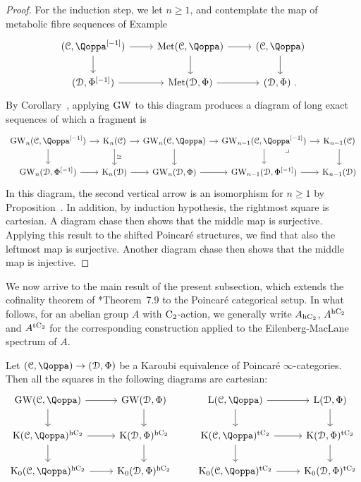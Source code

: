 \begin{proof}
For the induction step, we let $n\geq 1$, and 
contemplate the map of metabolic fibre sequences of Example~
\[
\begin{tikzcd} 
(\C,\QF\qshift{-1}) \ar[r] \ar[d] & \Met(\C,\QF) \ar[r] \ar[d] & (\C,\QF) \ar[d] \\
(\D,\QFD\qshift{-1}) \ar[r] & \Met(\D,\QFD)\ar[r] & (\D,\QFD) \ .
\end{tikzcd}
\]
By Corollary~,
applying $\operatorname{GW}$ to this diagram produces a diagram of long exact sequences of which a fragment is 
\[
\begin{tikzcd}
[column sep=1em] 
\GW_n(\C,\QF\qshift{-1}) \ar[r]\ar[d] & \K_n(\C)\ar[r]\ar[d,"\cong"] &\GW_n(\C,\QF)\ar[r]\ar[d] & \GW_{n-1}(\C,\QF\qshift{-1}) \ar[r]\ar[d]\arrow[dr, phantom, "\lrcorner", very near start]& \K_{n-1}(\C)\ar[d]\\
\GW_n(\D,\QFD\qshift{-1}) \ar[r] & \K_n(\D)\ar[r] & \GW_n(\D,\QFD)\ar[r] & \GW_{n-1}(\D, \QFD\qshift{-1}) \ar[r]& \K_{n-1}(\D)
\end{tikzcd}
\]
In this diagram, the second vertical arrow is an isomorphism for $n \geq 1$ by Proposition~. In addition, 
by induction hypothesis, 
the rightmost square is cartesian. A diagram chase then shows that the middle map is surjective. Applying this result to the shifted Poincar\'e structures, we find that also the leftmost map is surjective. Another diagram chase then shows that the middle map is injective.
\end{proof}


We now arrive to the main result of the present subsection, which extends the cofinality theorem of \cite{schlichting-derived}*{Theorem~7.9} 
to the Poincaré categorical setup. In what follows, for an abelian group $A$ with $\mathrm{C_2}$-action, we generally write $A_{\mathrm{h}\mathrm{C_2}}$, $A^{\mathrm{h}\mathrm{C_2}}$ and $A^{\mathrm{t}\mathrm{C_2}}$ for the corresponding construction applied to the Eilenberg-MacLane spectrum of $A$.


\begin{theorem}
\label{theorem:strong-cofinality}%
Let $(\C,\QF) \to (\D,\QFD)$ be a Karoubi equivalence of Poincaré $\infty$-categories.
Then all the squares in the following diagrams are cartesian:
\[
\begin{tikzcd}
\GW(\C,\QF)\ar[r]\ar[d] & \GW(\D,\QFD) \ar[d] \\
\K(\C,\QF)^\hC\ar[r]\ar[d] & \K(\D,\QFD)^\hC \ar[d] \\
\K_0(\C,\QF)^\hC\ar[r] & \K_0(\D,\QFD)^\hC
\end{tikzcd}
\qquad
\begin{tikzcd}
\L(\C,\QF)\ar[r]\ar[d] & \L(\D,\QFD)\ar[d] \\
\K(\C,\QF)^\tC\ar[r]\ar[d] & \K(\D,\QFD)^\tC \ar[d] \\
\K_0(\C,\QF)^\tC\ar[r] & \K_0(\D,\QFD)^\tC
\end{tikzcd}
\]
\end{theorem}

